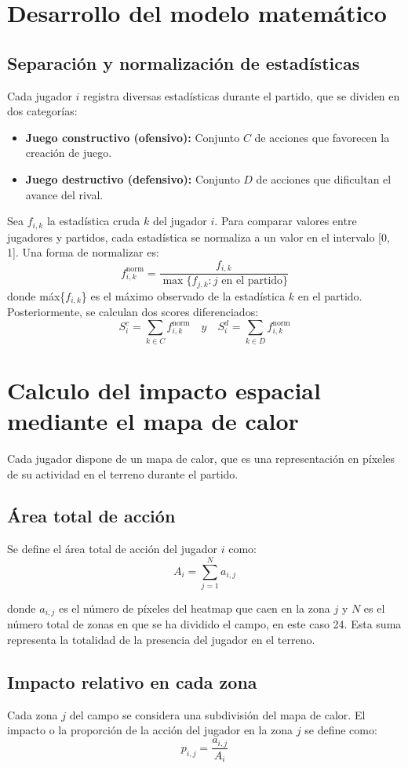 \section{Desarrollo del modelo matemático}
\subsection*{Separación y normalización de estadísticas}

Cada jugador $i$ registra diversas estadísticas durante el partido, que se dividen en dos
categorías:

\begin{itemize}
    \item \textbf{Juego constructivo (ofensivo):} Conjunto $C$ de acciones que favorecen la creación de juego.
    \item \textbf{Juego destructivo (defensivo):} Conjunto $D$ de acciones que dificultan el avance del rival.
\end{itemize}

Sea $f_{i,k}$ la estadística cruda $k$ del jugador $i$. Para comparar valores entre jugadores y
partidos, cada estadística se normaliza a un valor en el intervalo [0, 1]. Una forma de
normalizar es:
\[
f_{i,k}^{\text{norm}} = \frac{f_{i,k}}{\max\{f_{j,k} : j \text{ en el partido}\}}
\]
donde máx\{$f_{i,k}$\} es el máximo observado de la estadística $k$ en el partido.
Posteriormente, se calculan dos scores diferenciados:
\[
S_i^c = \sum_{k \in C} f_{i,k}^{\text{norm}} \quad y \quad S_i^d = \sum_{k \in D} f_{i,k}^{\text{norm}}
\]

\section{Calculo del impacto espacial mediante el mapa de calor}
Cada jugador dispone de un mapa de calor, que es una representación en píxeles de su
actividad en el terreno durante el partido.
\subsection*{Área total de acción}
Se define el área total de acción del jugador $i$ como:
\[
A_i = \sum_{j=1}^{N} a_{i,j}
\]

donde $a_{i,j}$ es el número de píxeles del heatmap que caen en la zona $j$ y $N$ es el número total de zonas en que se ha dividido el campo, en este caso 24. Esta suma representa la
totalidad de la presencia del jugador en el terreno.

\subsection*{Impacto relativo en cada zona}
Cada zona $j$ del campo se considera una subdivisión del mapa de calor. El impacto o la
proporción de la acción del jugador en la zona $j$ se define como:
\[
p_{i,j} = \frac{a_{i,j}}{A_i}
\]

